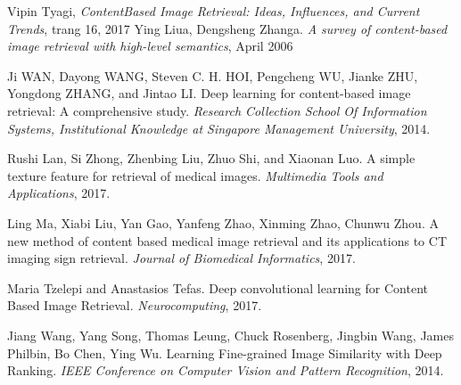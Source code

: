 \documentclass[a4paper,14pt]{extreport}
\begin{document}
\begin{thebibliography}{9}
Vipin Tyagi, \textit{ContentBased Image Retrieval: Ideas, Influences, and Current Trends}, trang 16, 2017
Ying Liua, Dengsheng Zhanga. \textit{A survey of content-based image retrieval with high-level semantics},  April 2006

Ji WAN, Dayong WANG, Steven C. H. HOI, Pengcheng WU, Jianke ZHU, Yongdong ZHANG, and Jintao LI.
Deep learning for content-based image retrieval: A comprehensive study.
\textit{Research Collection School Of Information Systems, Institutional Knowledge at Singapore Management University}, 2014.
 
Rushi Lan, Si Zhong, Zhenbing Liu, Zhuo Shi, and Xiaonan Luo.
A simple texture feature for retrieval of medical images.
\textit{Multimedia Tools and Applications}, 2017.
 
Ling Ma, Xiabi Liu, Yan Gao, Yanfeng Zhao, Xinming Zhao, Chunwu Zhou. A new method of content based medical image retrieval and its applications to CT imaging sign retrieval.
\textit{Journal of Biomedical Informatics}, 2017.

Maria Tzelepi and Anastasios Tefas. Deep convolutional learning for Content Based Image Retrieval.
\textit{Neurocomputing}, 2017.

Jiang Wang, Yang Song, Thomas Leung, Chuck Rosenberg, Jingbin Wang, James Philbin, Bo Chen, Ying Wu. Learning Fine-grained Image Similarity with Deep Ranking.
\textit{IEEE Conference on Computer Vision and Pattern Recognition}, 2014.
\end{thebibliography}
\end{document}
